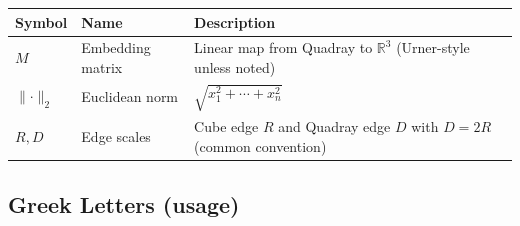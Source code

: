 \documentclass[
  10pt,
]{article}
\begin{document}
\begin{longtable}[]{@{}lll@{}}
\toprule
\begin{minipage}[b]{0.30\columnwidth}\raggedright
Symbol\strut
\end{minipage} & \begin{minipage}[b]{0.30\columnwidth}\raggedright
Name\strut
\end{minipage} & \begin{minipage}[b]{0.30\columnwidth}\raggedright
Description\strut
\end{minipage}\tabularnewline
\midrule
\endhead
\begin{minipage}[t]{0.30\columnwidth}\raggedright
\(M\)\strut
\end{minipage} & \begin{minipage}[t]{0.30\columnwidth}\raggedright
Embedding matrix\strut
\end{minipage} & \begin{minipage}[t]{0.30\columnwidth}\raggedright
Linear map from Quadray to \(\mathbb{R}^3\) (Urner-style unless
noted)\strut
\end{minipage}\tabularnewline
\begin{minipage}[t]{0.30\columnwidth}\raggedright
\(\lVert\cdot\rVert_2\)\strut
\end{minipage} & \begin{minipage}[t]{0.30\columnwidth}\raggedright
Euclidean norm\strut
\end{minipage} & \begin{minipage}[t]{0.30\columnwidth}\raggedright
\(\sqrt{x_1^2+\cdots+x_n^2}\)\strut
\end{minipage}\tabularnewline
\begin{minipage}[t]{0.30\columnwidth}\raggedright
\(R, D\)\strut
\end{minipage} & \begin{minipage}[t]{0.30\columnwidth}\raggedright
Edge scales\strut
\end{minipage} & \begin{minipage}[t]{0.30\columnwidth}\raggedright
Cube edge \(R\) and Quadray edge \(D\) with \(D=2R\) (common
convention)\strut
\end{minipage}\tabularnewline
\bottomrule
\end{longtable}

\hypertarget{greek-letters-usage}{%
\subsection{Greek Letters (usage)}\label{greek-letters-usage}}
\end{document}
